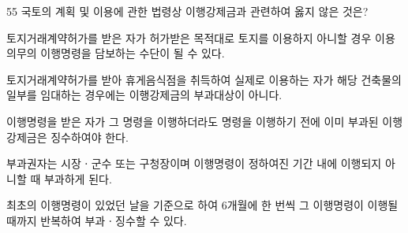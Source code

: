 \begin{question}{55}
국토의 계획 및 이용에 관한 법령상 이행강제금과 관련하여 옳지 않은 것은?
\begin{choices}
  \item 토지거래계약허가를 받은 자가 허가받은 목적대로 토지를 이용하지 아니할 경우 이용의무의 이행명령을 담보하는 수단이 될 수 있다.
  \item 토지거래계약허가를 받아 휴게음식점을 취득하여 실제로 이용하는 자가 해당 건축물의 일부를 임대하는 경우에는 이행강제금의 부과대상이 아니다.
  \item 이행명령을 받은 자가 그 명령을 이행하더라도 명령을 이행하기 전에 이미 부과된 이행강제금은 징수하여야 한다.
  \item 부과권자는 시장ㆍ군수 또는 구청장이며 이행명령이 정하여진 기간 내에 이행되지 아니할 때 부과하게 된다.
  \item 최초의 이행명령이 있었던 날을 기준으로 하여 6개월에 한 번씩 그 이행명령이 이행될 때까지 반복하여 부과ㆍ징수할 수 있다.
\end{choices}
\end{question}
